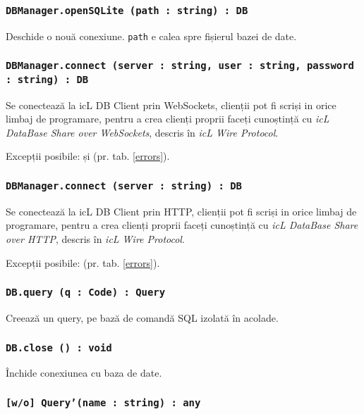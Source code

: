 \subsubsection{\texttt{DBManager.openSQLite (path : string) : DB}}

Deschide o nouă conexiune. \texttt{path} e calea spre fișierul bazei de date.

\subsubsection{\texttt{DBManager.connect (server : string, user : string, password : string) : DB}}

Se conectează la icL DB Client prin WebSockets, clienții pot fi scriși in orice limbaj de programare, pentru a crea clienți proprii faceți cunoștință cu \textit{icL DataBase Share over WebSockets}, descris în \textit{icL Wire Protocol}.

Excepții posibile:  și  (pr. tab. \ref{errors}).

\subsubsection{\texttt{DBManager.connect (server : string) : DB}}

Se conectează la icL DB Client prin HTTP, clienții pot fi scriși in orice limbaj de programare, pentru a crea clienți proprii faceți cunoștință cu \textit{icL DataBase Share over HTTP}, descris în \textit{icL Wire Protocol}.

Excepții posibile:  (pr. tab. \ref{errors}).

\subsubsection{\texttt{DB.query (q : Code) : Query}}

Creează un query, pe bază de comandă SQL izolată în acolade.

\subsubsection{\texttt{DB.close () : void}}

Închide conexiunea cu baza de date.

\subsubsection{\texttt{[w/o] Query'(name : string) : any}}

